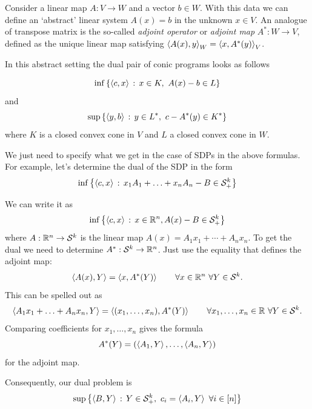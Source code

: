 Consider a linear map $A : V \to W$ and a vector $b \in W$. With this data we can define an `abstract' linear system $A(x) = b$ in the unknown $x \in V$. An analogue of transpose matrix is the so-called \emph{adjoint operator} or \emph{adjoint map} $A^\ast : W \to V$, defined as the unique linear map satisfying $\left\langle A(x) , y \right\rangle_W = \left\langle x , A^\ast(y) \right\rangle_V$. 

In this abstract setting the dual pair of conic programs looks as follows

\[
	\inf \setcond{ \sprod{c}{x}}{ x \in K, \ A (x) - b \in L}
\]
and
\[
	\sup \left\{  \left\langle y , b \right\rangle \,:\, y \in L^\ast, \ c - A^\ast (y) \in K^\ast \right\}
\]
where $K$ is a closed convex cone in $V$ and $L$ a closed convex cone in $W$. 



\newcommand{\cA}{\mathcal{A}}
We just need to specify what we get in the case of SDPs in the above formulas. For example, let's determine the dual of the SDP in the form
\[
	\inf \left\{  \left\langle c , x \right\rangle \,:\,  x_1 A_1 + \ldots + x_n A_n - B \in \mathcal{S}_+^k \right\}
\]

We can write it as 
\[
	\inf \left\{  \left\langle c , x \right\rangle \,:\, x \in \mathbb{R}^n, A(x) - B \in \mathcal{S}_+^k \right\}
\]
where $A : \mathbb{R}^n \to \mathcal{S}^k$ is the linear map $A(x) = A_1 x_1 + \cdots + A_n x_n$. To get the dual we need to determine $A^\ast : \mathcal{S}^k \to \mathbb{R}^n$. Just use the equality that defines the adjoint map:
\[
	\left\langle A(x) , Y \right\rangle = \left\langle x , A^\ast(Y) \right\rangle \qquad \forall x \in \mathbb{R}^n \ \forall Y \in \mathcal{S}^k.
\]
This can be spelled out as
\[
	\left\langle A_1 x_1 + \ldots + A_n x_n , Y \right\rangle = \left\langle (x_1,\ldots,x_n) , A^\ast(Y) \right\rangle \qquad \forall x_1,\ldots,x_n \in \mathbb{R} \ \forall Y \in \mathcal{S}^k.
\]
Comparing coefficients for $x_1,\ldots,x_n$ gives the formula 
\[
	A^\ast(Y) = ( \left\langle A_1 , Y \right\rangle,\ldots, \left\langle A_n , Y \right\rangle)
\]
for the adjoint map.

Consequently, our dual problem is 
\[
	\sup \left\{  \left\langle B , Y \right\rangle \,:\, Y \in \mathcal{S}_+^k, \ c_i = \left\langle A_i , Y \right\rangle \ \forall i \in [n] \right\}
\]

